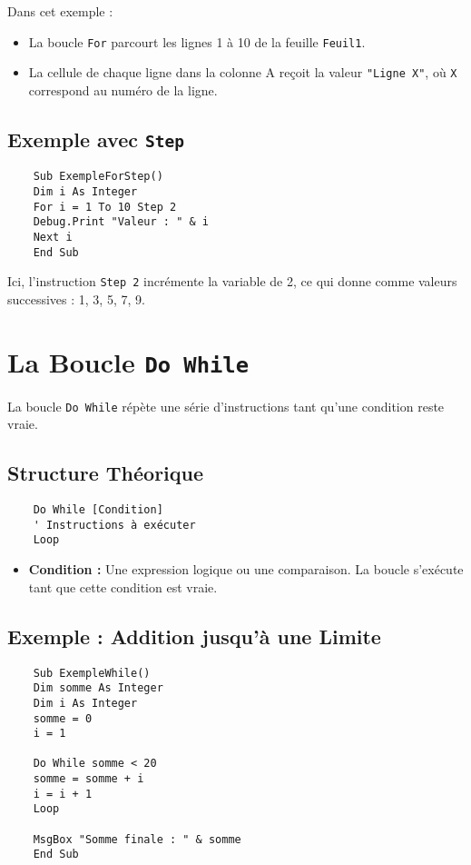 \documentclass[a4paper,12pt]{report}
\begin{document}
Dans cet exemple :
\begin{itemize}
	\item La boucle \texttt{For} parcourt les lignes 1 à 10 de la feuille \texttt{Feuil1}.
	\item La cellule de chaque ligne dans la colonne A reçoit la valeur \texttt{"Ligne X"}, où \texttt{X} correspond au numéro de la ligne.
\end{itemize}

\subsection*{Exemple avec \texttt{Step}}
\begin{lstlisting}
	Sub ExempleForStep()
	Dim i As Integer
	For i = 1 To 10 Step 2
	Debug.Print "Valeur : " & i
	Next i
	End Sub
\end{lstlisting}

Ici, l'instruction \texttt{Step 2} incrémente la variable de 2, ce qui donne comme valeurs successives : 1, 3, 5, 7, 9.

\section{La Boucle \texttt{Do While}}
La boucle \texttt{Do While} répète une série d'instructions tant qu'une condition reste vraie.

\subsection*{Structure Théorique}
\begin{lstlisting}
	Do While [Condition]
	' Instructions à exécuter
	Loop
\end{lstlisting}

\begin{itemize}
	\item \textbf{Condition :} Une expression logique ou une comparaison. La boucle s'exécute tant que cette condition est vraie.
\end{itemize}

\subsection*{Exemple : Addition jusqu'à une Limite}
\begin{lstlisting}
	Sub ExempleWhile()
	Dim somme As Integer
	Dim i As Integer
	somme = 0
	i = 1
	
	Do While somme < 20
	somme = somme + i
	i = i + 1
	Loop
	
	MsgBox "Somme finale : " & somme
	End Sub
\end{lstlisting}
\end{document}
